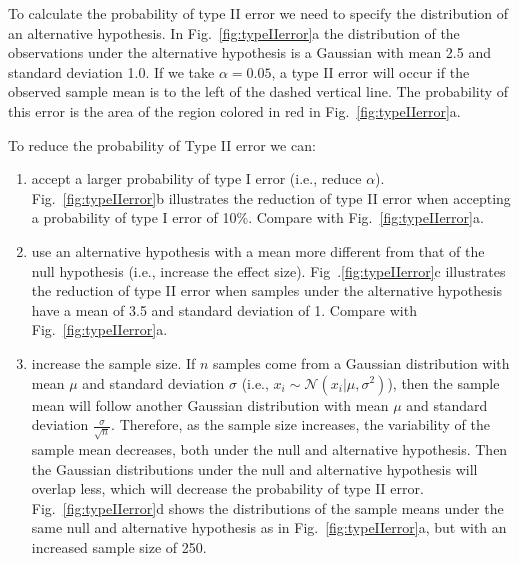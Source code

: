 \documentclass[12pt]{article}
\begin{document}
\begin{enumerate}[(a)]
        To calculate the probability of type II error we need to specify the
        distribution of an alternative hypothesis. In
        Fig.~\ref{fig:typeIIerror}a the distribution of
        the observations under the alternative hypothesis is a Gaussian with
        mean 2.5 and standard deviation 1.0. If we take $\alpha=0.05$, a type
        II error will occur if the observed sample mean is to the left of the
        dashed vertical line. The probability of this error is the area of the
        region colored in red in
        Fig.~\ref{fig:typeIIerror}a.

        To reduce the probability of Type II error we can:

        \begin{enumerate}[1.]

            \item accept a larger probability of type I error (i.e., reduce
                $\alpha$).
                Fig.~\ref{fig:typeIIerror}b
                illustrates the reduction of type II error when accepting a
                probability of type I error of 10\%. Compare with
                Fig.~\ref{fig:typeIIerror}a.

            \item use an alternative hypothesis with a mean more different from
                that of the null hypothesis (i.e., increase the effect size).
                Fig~.\ref{fig:typeIIerror}c
                illustrates the reduction of type II error when samples under
                the alternative hypothesis have a mean of 3.5 and standard
                deviation of 1. Compare with
                Fig.~\ref{fig:typeIIerror}a.

            \item increase the sample size. If $n$ samples come from a Gaussian
                distribution with mean $\mu$ and standard deviation $\sigma$
                (i.e., $x_i\sim\mathcal{N}(x_i|\mu,\sigma^2)$), then the sample
                mean will follow another Gaussian distribution with mean $\mu$
                and standard deviation $\frac{\sigma}{\sqrt{n}}$. Therefore, as
                the sample size increases, the variability of the sample mean
                decreases, both under the null and alternative hypothesis. Then
                the Gaussian distributions under the null and alternative
                hypothesis will overlap less, which will decrease the
                probability of type II error.
                Fig.~\ref{fig:typeIIerror}d shows
                the distributions of the sample means under the same null
                and alternative hypothesis as in 
                Fig.~\ref{fig:typeIIerror}a, but
                with an increased sample size of 250.
        \end{enumerate}
    

\end{enumerate}
\end{document}

